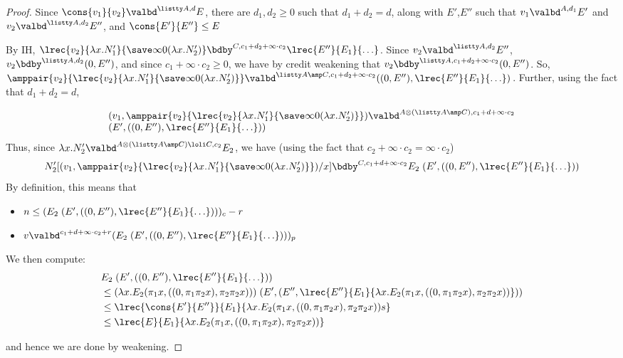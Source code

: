 \begin{proof}
Since $\cons {v_1} {v_2} \valbd^{\listty A,d} E$, there are $d_1,d_2 \geq 0$ such that $d_1 + d_2 = d$, along with $E'$,$E''$ such that $v_1 \valbd^{A,d_1} E'$ and $v_2 \valbd^{\listty A,d_2} E''$, and $\cons {E'} {E''} \leq E$

By IH, $\lrec {v_2} {\lambda x.N_1'} {\save \infty 0 {(\lambda x.N_2')}} \bdby^{C,c_1 + d_2 + \infty \cdot c_2} \lrec {E''} {E_1} {\ldots}$. 
Since $v_2 \valbd^{\listty A,d_2} E''$, $v_2 \bdby^{\listty A,d_2} (0,E'')$, 
and since $c_1 + \infty \cdot c_2 \geq 0$, we have by credit weakening that $v_2 \bdby^{\listty A,c_1 + d_2 + \infty \cdot c_2} (0,E'')$. 
So, 
$\amppair {v_2} {\lrec {v_2} {\lambda x.N_1'} {\save \infty 0 {(\lambda x.N_2')}}} \valbd^{\listty A \amp C,c_1 + d_2 + \infty \cdot c_2} ((0,E''),\lrec {E''} {E_1} {\ldots})$. 
Further, using the fact that $d_1 + d_2 = d$, 

$$
\begin{array}{l}
(v_1,\amppair {v_2} {\lrec {v_2} {\lambda x.N_1'} {\save \infty 0 {(\lambda x.N_2')}}}) \valbd^{A \otimes (\listty A \amp C), c_1 + d + \infty \cdot c_2}\\ (E',((0,E''),\lrec {E''} {E_1} {\ldots}))
\end{array}
$$
Thus, since $\lambda x.N_2' \valbd^{A \otimes (\listty A \amp C) \loli C,c_2} E_2$, we have (using the fact that $c_2 + \infty \cdot c_2 = \infty \cdot c_2$)
$$
N_2'[(v_1,\amppair {v_2} {\lrec {v_2} {\lambda x.N_1'} {\save \infty 0 {(\lambda x.N_2')}}})/x] \bdby^{C,c_1+d+\infty \cdot c_2} E_2 \; (E',((0,E''),\lrec {E''} {E_1} {\ldots}))
$$
By definition, this means that
\begin{itemize}
  \item $n \leq (E_2 \; (E',((0,E''),\lrec {E''} {E_1} {\ldots})))_c - r$
  \item $v \valbd^{c_1+d+\infty \cdot c_2 + r} (E_2 \; (E',((0,E''),\lrec {E''} {E_1} {\ldots})))_p$
\end{itemize}
We then compute:
\begin{align*}
&E_2 \; (E',((0,E''),\lrec {E''} {E_1} {\ldots}))\\
&\leq (\lambda x. E_2 (\pi_1 x,((0,\pi_1 \pi_2 x),\pi_2\pi_2 x))) \; (E',(E'',\lrec {E''} {E_1} {\lambda x. E_2 (\pi_1 x,((0,\pi_1 \pi_2 x),\pi_2\pi_2 x))}))\\
&\leq \lrec {\cons {E'} {E''}} {E_1} {\lambda x. E_2 (\pi_1 x,((0,\pi_1 \pi_2 x),\pi_2\pi_2 x))s}\\
&\leq \lrec {E} {E_1} {\lambda x. E_2 (\pi_1 x,((0,\pi_1 \pi_2 x),\pi_2\pi_2 x)) }
\end{align*}

and hence we are done by weakening.
\end{proof}
